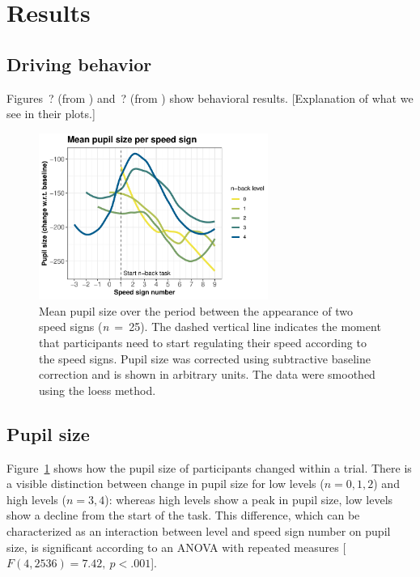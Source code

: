 
\section{Results}\label{sec:results}
\subsection{Driving behavior}
Figures~? (from \citealp{DeMooij2021}) and~? (from \citealp{Kelapanda2021}) show behavioral results.
[Explanation of what we see in their plots.]

\begin{figure}
  \centering
  \includegraphics[width=7.5cm]{images/speed_sign_nback.pdf}
  \caption{Mean pupil size over the period between the appearance of two speed signs (\textit{n}\ =\ 25).
  The dashed vertical line indicates the moment that participants need to start regulating their speed according to the speed signs.
  Pupil size was corrected using subtractive baseline correction and is shown in arbitrary units. 
  The data were smoothed using the loess method.}
  \label{fig:ps-speed-sign}
\end{figure}

\subsection{Pupil size}
Figure~\ref{fig:ps-speed-sign} shows how the pupil size of participants changed within a trial.
There is a visible distinction between change in pupil size for low \nback levels (\(n = 0,1,2\)) and high \nback levels (\(n = 3,4\)):
whereas high \nback levels show a peak in pupil size, low \nback levels show a decline from the start of the task.
This difference, which can be characterized as an interaction between \nback level and speed sign number on pupil size, is significant according to an ANOVA with repeated measures [\(F(4,2536)=7.42,\ p < .001\)].

